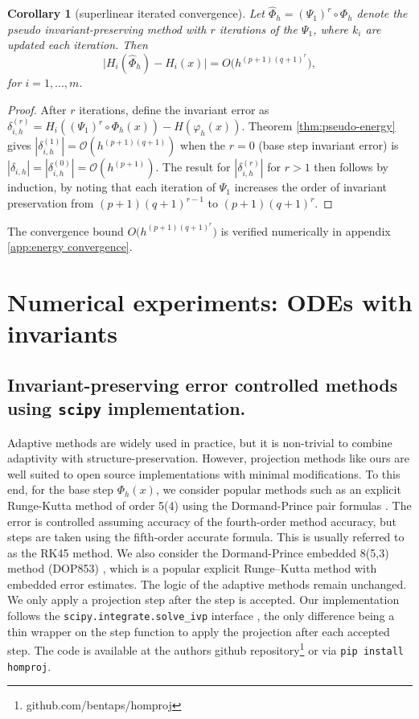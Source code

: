 \documentclass[final,3p,times]{elsarticle}
\newtheorem{corollary}[theorem]{Corollary}
\begin{document}
\begin{corollary}[superlinear iterated convergence]\label{cor:superlinear}
Let $\widehat\Phi_h=(\Psi_1)^r\circ\Phi_h$ denote the pseudo invariant-preserving method with $r$ iterations of the $\Psi_1$, where $k_i$ are updated each iteration. Then
$$
\big|H_i(\widehat\Phi_h)-H_i(x)\big|= O\big(h^{(p+1)(q+1)^r}\big),
$$
for $i=1,...,m$. 
\end{corollary}
\begin{proof}  
  After $r$ iterations, define the invariant error as $ \delta^{(r)}_{i,h}=H_i(\left(\Psi_1\right)^r\circ\Phi_h(x))-H(\varphi_h(x))$. Theorem \ref{thm:pseudo-energy} gives $|\delta^{(1)}_{i,h}|=\mathcal O(h^{(p+1)(q+1)})$ when the $r=0$ (base step invariant error) is $|\delta_{i,h}|=|\delta^{(0)}_{i,h}|=\mathcal O(h^{(p+1)})$. The result for $|\delta^{(r)}_{i,h}|$ for $r>1$ then follows by induction, by noting that each iteration of $\Psi_1$ increases the order of invariant preservation from $(p+1)(q+1)^{r-1}$ to $(p+1)(q+1)^r$.
\end{proof} 

The convergence bound $O\big(h^{(p+1)(q+1)^r}\big)$ is verified numerically in appendix \ref{app:energy convergence}. 
  
\section{Numerical experiments: ODEs with invariants}\label{sec:numerical experiments ODEs}

\subsection{Invariant-preserving error controlled methods using \texttt{scipy} implementation.} 
Adaptive methods are widely used in practice, but it is non-trivial to combine adaptivity with structure-preservation. However, projection methods like ours are well suited to open source implementations with minimal modifications. To this end, for the base step $\Phi_h(x)$, we consider popular methods such as an explicit Runge-Kutta method of order 5(4) using the Dormand-Prince pair formulas \cite{dormand1980family}. The error is controlled assuming accuracy of the fourth-order method accuracy, but steps are taken using the fifth-order accurate formula. This is usually referred to as the RK45 method. We also consider the Dormand-Prince embedded 8(5,3) method (DOP853) \cite{hairer1987solving}, which is a popular explicit Runge–Kutta method with embedded error estimates. The logic of the adaptive methods remain unchanged. We only apply a projection step after the step is accepted. Our implementation follows the \texttt{scipy.integrate.solve\_ivp} interface \cite{2020SciPy-NMeth}, the only difference being a thin wrapper on the step function to apply the projection after each accepted step. The code is available at the authors github repository\footnote{github.com/bentaps/homproj} or via \texttt{pip install homproj}.
\end{document}
